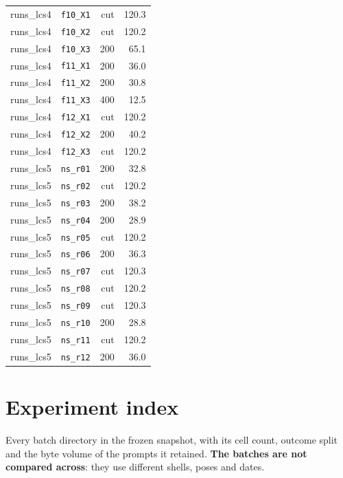\begin{longtable}{@{}llrr@{}}
runs\_lcs4 & \texttt{f10\_X1} & cut & 120.3 \\
runs\_lcs4 & \texttt{f10\_X2} & cut & 120.2 \\
runs\_lcs4 & \texttt{f10\_X3} & 200 & 65.1 \\
runs\_lcs4 & \texttt{f11\_X1} & 200 & 36.0 \\
runs\_lcs4 & \texttt{f11\_X2} & 200 & 30.8 \\
runs\_lcs4 & \texttt{f11\_X3} & 400 & 12.5 \\
runs\_lcs4 & \texttt{f12\_X1} & cut & 120.2 \\
runs\_lcs4 & \texttt{f12\_X2} & 200 & 40.2 \\
runs\_lcs4 & \texttt{f12\_X3} & cut & 120.2 \\
runs\_lcs5 & \texttt{ns\_r01} & 200 & 32.8 \\
runs\_lcs5 & \texttt{ns\_r02} & cut & 120.2 \\
runs\_lcs5 & \texttt{ns\_r03} & 200 & 38.2 \\
runs\_lcs5 & \texttt{ns\_r04} & 200 & 28.9 \\
runs\_lcs5 & \texttt{ns\_r05} & cut & 120.2 \\
runs\_lcs5 & \texttt{ns\_r06} & 200 & 36.3 \\
runs\_lcs5 & \texttt{ns\_r07} & cut & 120.3 \\
runs\_lcs5 & \texttt{ns\_r08} & cut & 120.2 \\
runs\_lcs5 & \texttt{ns\_r09} & cut & 120.3 \\
runs\_lcs5 & \texttt{ns\_r10} & 200 & 28.8 \\
runs\_lcs5 & \texttt{ns\_r11} & cut & 120.2 \\
runs\_lcs5 & \texttt{ns\_r12} & 200 & 36.0 \\
\end{longtable}

\section{Experiment index}
\label{app:index}

Every batch directory in the frozen snapshot, with its cell count, outcome split and the byte volume of the prompts it retained. \textbf{The batches are not compared across}: they use different shells, poses and dates.

